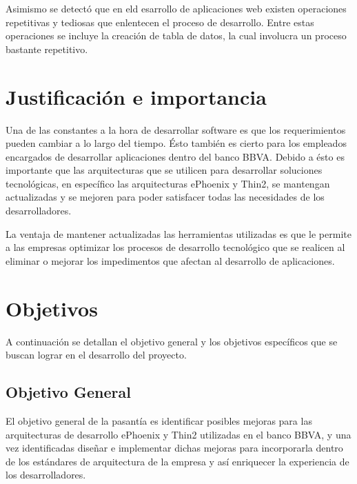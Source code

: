 Asimismo se detectó que en eld esarrollo de aplicaciones web existen operaciones
repetitivas y tediosas que enlentecen el proceso de desarrollo. Entre estas
operaciones se incluye la creación de tabla de datos, la cual involucra
un proceso bastante repetitivo.

\section*{Justificación e importancia}
Una de las constantes a la hora de desarrollar software es que los
requerimientos pueden cambiar a lo largo del tiempo. Ésto también
es cierto para los empleados encargados de desarrollar aplicaciones
dentro del banco BBVA. Debido a ésto es importante que las arquitecturas
que se utilicen para desarrollar soluciones tecnológicas, en específico
las arquitecturas ePhoenix y Thin2, se mantengan actualizadas y se mejoren
para poder satisfacer todas las necesidades de los desarrolladores.

La ventaja de mantener actualizadas las herramientas utilizadas es que le permite
a las empresas optimizar los procesos de desarrollo tecnológico que se realicen al
eliminar o mejorar los impedimentos que afectan al desarrollo de aplicaciones.

\section*{Objetivos}
A continuación se detallan el objetivo general y los objetivos específicos que
se buscan lograr en el desarrollo del proyecto.
\subsection*{Objetivo General}
El objetivo general de la pasantía es identificar posibles mejoras para las arquitecturas
de desarrollo ePhoenix y Thin2 utilizadas en el banco BBVA, y una vez
identificadas diseñar e implementar dichas mejoras para incorporarla dentro de los
estándares de arquitectura de la empresa y así enriquecer la experiencia de los
desarrolladores.
